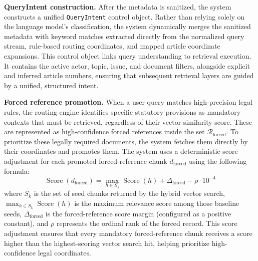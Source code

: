 \textbf{QueryIntent construction.} After the metadata is sanitized, the system constructs a unified \texttt{QueryIntent} control object. Rather than relying solely on the language model's classification, the system dynamically merges the sanitized metadata with keyword matches extracted directly from the normalized query stream, rule-based routing coordinates, and mapped article coordinate expansions. This control object links query understanding to retrieval execution. It contains the active actor, topic, issue, and document filters, alongside explicit and inferred article numbers, ensuring that subsequent retrieval layers are guided by a unified, structured intent.

\textbf{Forced reference promotion.} When a user query matches high-precision legal rules, the routing engine identifies specific statutory provisions as mandatory contexts that must be retrieved, regardless of their vector similarity score. These are represented as high-confidence forced references inside the set $\mathcal{R}_{\mathrm{forced}}$. To prioritize these legally required documents, the system fetches them directly by their coordinates and promotes them. The system uses a deterministic score adjustment for each promoted forced-reference chunk $d_{\mathrm{forced}}$ using the following formula:
\[
\operatorname{Score}(d_{\mathrm{forced}}) =
\max_{h \in S_k} \operatorname{Score}(h)
+ \Delta_{\mathrm{forced}}
- \rho \cdot 10^{-4}
\]
where $S_k$ is the set of seed chunks returned by the hybrid vector search, $\max_{h \in S_k} \operatorname{Score}(h)$ is the maximum relevance score among those baseline seeds, $\Delta_{\mathrm{forced}}$ is the forced-reference score margin (configured as a positive constant), and $\rho$ represents the ordinal rank of the forced record. This score adjustment ensures that every mandatory forced-reference chunk receives a score higher than the highest-scoring vector search hit, helping prioritize high-confidence legal coordinates.

